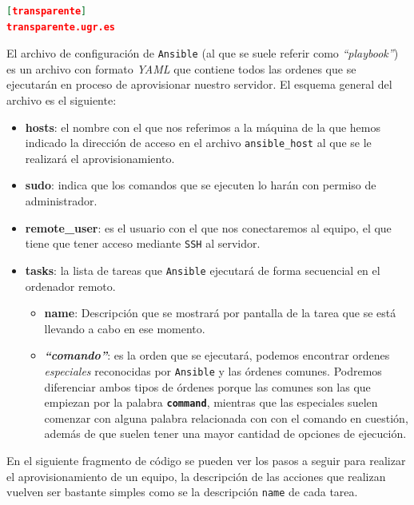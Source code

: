 \begin{lstlisting}[language=json,caption={Archivo de hosts de Ansible},label={lst:hosts}]
[transparente]
transparente.ugr.es
\end{lstlisting}

El archivo de configuración de {\tt Ansible} (al que se suele referir como \textit{``playbook''}) es un archivo con formato \textit{YAML} que contiene todos las ordenes que se ejecutarán en proceso de aprovisionar nuestro servidor. El esquema general del archivo es el siguiente:

\begin{itemize}
	\item \textbf{hosts}: el nombre con el que nos referimos a la máquina de la que hemos indicado la dirección de acceso en el archivo {\tt ansible\_host} al que se le realizará el aprovisionamiento.
	\item \textbf{sudo}: indica que los comandos que se ejecuten lo harán con permiso de administrador.
	\item \textbf{remote\_user}: es el usuario con el que nos conectaremos al equipo, el que tiene que tener acceso mediante {\tt SSH} al servidor.
	\item \textbf{tasks}: la lista de tareas que {\tt Ansible} ejecutará de forma secuencial en el ordenador remoto.
	\begin{itemize}
		\item \textbf{name}: Descripción que se mostrará por pantalla de la tarea que se está llevando a cabo en ese momento.
		\item \textbf{\textit{``comando''}}: es la orden que se ejecutará, podemos encontrar ordenes \textit{especiales} reconocidas por {\tt Ansible} y las órdenes comunes. Podremos diferenciar ambos tipos de órdenes porque las comunes son las que empiezan por la palabra \textbf{\tt command}, mientras que las especiales suelen comenzar con alguna palabra relacionada con con el comando en cuestión, además de que suelen tener una mayor cantidad de opciones de ejecución.
	\end{itemize}
\end{itemize}

En el siguiente fragmento de código se pueden ver los pasos a seguir para realizar el aprovisionamiento de un equipo, la descripción de las acciones que realizan vuelven ser bastante simples como se la descripción {\tt name} de cada tarea.


